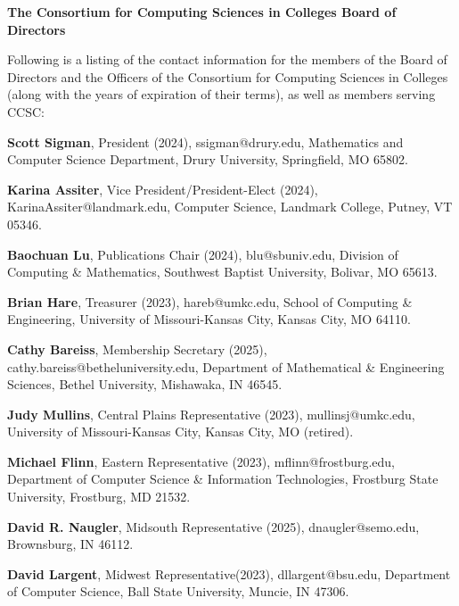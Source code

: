 \documentclass{article}
\begin{document}
\begingroup
  \centering
  \textbf{\large The Consortium for Computing Sciences in Colleges Board of Directors\\}
\endgroup

\begin{multicols}{2}
\begin{raggedright}

\small{

\noindent
Following is a listing of the contact information for the members of the Board
of Directors and the Officers of the Consortium for Computing Sciences in
Colleges (along with the years of expiration of their terms), as well as members
serving CCSC:

\noindent
\textbf{Scott Sigman}, President (2024), ssigman@drury.edu,
Mathematics and Computer Science Department, Drury University, Springfield, MO 65802.

\noindent
\textbf{Karina Assiter}, Vice President/President-Elect (2024), KarinaAssiter@landmark.edu,
Computer Science, Landmark College, Putney, VT 05346.

\noindent
\textbf{Baochuan Lu}, Publications Chair (2024),
blu@sbuniv.edu, Division of Computing \& Mathematics, Southwest Baptist University, Bolivar, MO 65613.

\noindent
\textbf{Brian Hare}, Treasurer (2023), hareb@umkc.edu,
School of Computing \& Engineering, University of Missouri-Kansas City, Kansas City, MO 64110.

\noindent
\textbf{Cathy Bareiss}, Membership Secretary (2025), cathy.bareiss@betheluniversity.edu,
Department of Mathematical \& Engineering Sciences, Bethel University, Mishawaka, IN 46545.

\noindent
\textbf{Judy Mullins}, Central Plains Representative (2023), mullinsj@umkc.edu, University of Missouri-Kansas City, Kansas City, MO (retired).

\noindent
\textbf{Michael Flinn}, Eastern Representative (2023), mflinn@frostburg.edu,
Department of Computer Science \& Information Technologies,
Frostburg State University, Frostburg, MD 21532.

\vspace{10pt}
\noindent
\textbf{David R. Naugler}, Midsouth Representative (2025),
dnaugler@semo.edu, Brownsburg, IN 46112.

\noindent
\textbf{David Largent}, Midwest Representative(2023), dllargent@bsu.edu,
Department of Computer Science,
Ball State University, 
Muncie, IN 47306.

}
\end{raggedright}
\end{multicols}
\end{document}

